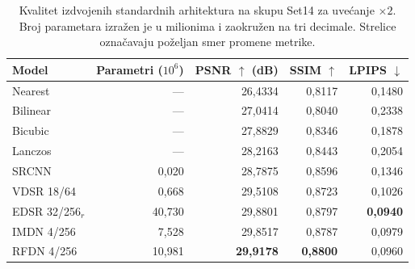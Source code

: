 \begin{table}[H]
    \centering
    \caption{Kvalitet izdvojenih standardnih arhitektura na skupu Set14 za uvećanje $\times2$. Broj parametara izražen je u milionima i zaokružen na tri decimale. Strelice označavaju poželjan smer promene metrike.}
    \label{tab:results_2x_Set14}
    \begingroup
    \small
    \setlength{\tabcolsep}{4pt}
    \renewcommand{\arraystretch}{1.15}
    \begin{tabular}{@{}lrrrr@{}}
        \toprule
        Model & \shortstack{Parametri\\($10^6$)} & \shortstack{PSNR $\uparrow$\\(dB)} & SSIM $\uparrow$ & LPIPS $\downarrow$ \\
        \midrule
        Nearest & --- & 26,4334 & 0,8117 & 0,1480 \\
        Bilinear & --- & 27,0414 & 0,8040 & 0,2338 \\
        Bicubic & --- & 27,8829 & 0,8346 & 0,1878 \\
        Lanczos & --- & 28,2163 & 0,8443 & 0,2054 \\
        \midrule
        SRCNN & 0,020 & 28,7875 & 0,8596 & 0,1346 \\
        VDSR 18/64 & 0,668 & 29,5108 & 0,8723 & 0,1026 \\
        EDSR 32/256$_{r}$ & 40,730 & 29,8801 & 0,8797 & \textbf{0,0940} \\
        IMDN 4/256 & 7,528 & 29,8517 & 0,8787 & 0,0979 \\
        RFDN 4/256 & 10,981 & \textbf{29,9178} & \textbf{0,8800} & 0,0960 \\
        \bottomrule
    \end{tabular}
    \endgroup
\end{table}